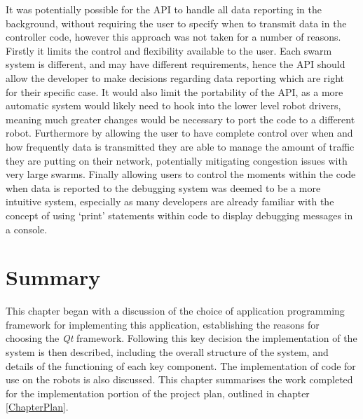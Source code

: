 It was potentially possible for the API to handle all data reporting in the background, without requiring the user to specify when to transmit data in the controller code, however this approach was not taken for a number of reasons. Firstly it limits the control and flexibility available to the user. Each swarm system is different, and may have different requirements, hence the API should allow the developer to make decisions regarding data reporting which are right for their specific case. It would also limit the portability of the API, as a more automatic system would likely need to hook into the lower level robot drivers, meaning much greater changes would be necessary to port the code to a different robot. Furthermore by allowing the user to have complete control over when and how frequently data is transmitted they are able to manage the amount of traffic they are putting on their network, potentially mitigating congestion issues with very large swarms. Finally allowing users to control the moments within the code when data is reported to the debugging system was deemed to be a more intuitive system, especially as many developers are already familiar with the concept of using `print' statements within code to display debugging messages in a console.


\section{Summary}
This chapter began with a discussion of the choice of application programming framework for implementing this application, establishing the reasons for choosing the \textit{Qt} framework. Following this key decision the implementation of the system is then described, including the overall structure of the system, and details of the functioning of each key component. The implementation of code for use on the robots is also discussed. This chapter summarises the work completed for the implementation portion of the project plan, outlined in chapter \ref{ChapterPlan}.